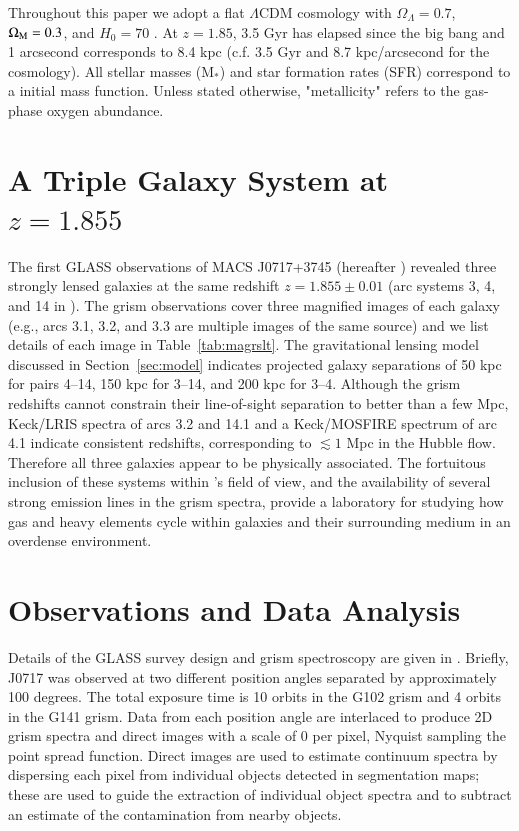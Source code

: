 Throughout this paper we adopt a flat $\Lambda$CDM cosmology with $\Omega_{\Lambda}=0.7$, $\Omega_{\rm M}=0.3$,
and $H_0=70$ \Hunit. At $z=1.85$, 3.5 Gyr has elapsed since the big bang and 1 arcsecond corresponds to 8.4 kpc
(c.f. 3.5 Gyr and 8.7 kpc/arcsecond for the \citealt{Planck2013} cosmology). All stellar masses (M$_*$) and star
formation rates (SFR) correspond to a \cite{Chabrier2003} initial mass function. Unless stated otherwise,
"metallicity" refers to the gas-phase oxygen abundance.


\section{A Triple Galaxy System at $z=1.855$}

The first GLASS observations of MACS J0717+3745 (hereafter \clyi) revealed three strongly lensed galaxies at the
same redshift $z=1.855\pm0.01$ (arc systems 3, 4, and 14 in \citealt{Schmidt2014}). The grism observations cover
three magnified images of each galaxy (e.g., arcs 3.1, 3.2, and 3.3 are multiple images of the same source) and
we list details of each image in Table~\ref{tab:magrslt}. The gravitational lensing model discussed in
Section~\ref{sec:model} indicates projected galaxy separations of 50 kpc for pairs 4--14, 150 kpc for 3--14, and
200 kpc for 3--4. Although the grism redshifts cannot constrain their line-of-sight separation to better than a
few Mpc, Keck/LRIS spectra of arcs 3.2 and 14.1 \citep{Limousin2012} and a Keck/MOSFIRE spectrum of arc 4.1
\citep{Schmidt2014} indicate consistent redshifts, corresponding to $\lesssim1$ Mpc in the Hubble flow. Therefore
all three galaxies appear to be physically associated. The fortuitous inclusion of these systems within \hst's
field of view, and the availability of several strong emission lines in the grism spectra, provide a laboratory
for studying how gas and heavy elements cycle within galaxies and their surrounding medium in an overdense
environment.


\section{Observations and Data Analysis}\label{sec:data}

Details of the GLASS survey design and grism spectroscopy are given in \citet{Schmidt2014}. Briefly, J0717 was
observed at two different position angles separated by approximately 100 degrees. The total exposure time is 10
orbits in the G102 grism and 4 orbits in the G141 grism. Data from each position angle are interlaced to produce
2D grism spectra and direct images with a scale of 0 per pixel, Nyquist sampling the point spread
function. Direct images are used to estimate continuum spectra by dispersing each pixel from individual objects
detected in \sex \citep{Bertin1996} segmentation maps; these are used to guide the extraction of
individual object spectra and to subtract an estimate of the contamination from nearby objects.

